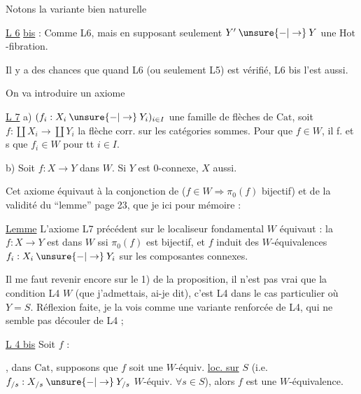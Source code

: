Notons la variante bien naturelle

\uline{L 6} \uline{bis} : Comme L6,  mais en supposant seulement $Y'\mathbin{\unsure{-|\to}}Y$ une $\mathrm{Hot}$-fibration.

Il y a des chances que  quand L6 (ou seulement L5) est vérifié, L6 bis l'est aussi.

On va introduire un axiome

\uline{L 7} a)  $(f_i:X_i\mathbin{\unsure{-|\to}}Y_i)_{i\in I}$ une famille de flèches de $\mathrm{Cat}$, soit $f:\coprod X_i\longrightarrow\coprod Y_i$ la flèche  corr. sur les catégories sommes. Pour que $f\in W$,  il f. et s que $f_i\in W$ pour tt $i\in I$.

b) Soit $f:X\longrightarrow Y$ dans $W$. Si $Y$ est $0$-connexe, $X$ aussi.

Cet axiome équivaut à la conjonction de  ($f\in W\Longrightarrow\pi_0(f)$ bijectif) et de la validité du ``lemme'' page 23, que je  ici pour mémoire :

\uline{Lemme} L'axiome L7 précédent sur le localiseur fondamental $W$ équivaut : la   $f:X\longrightarrow Y$  est dans $W$ ssi $\pi_0(f)$ est bijectif, et  $f$ induit des $W$-équivalences $f_i:X_i\mathbin{\unsure{-|\to}}Y_i$ sur les composantes connexes.

Il me faut revenir encore sur le 1) de la proposition, il n'est pas vrai que   la condition L4  $W$ (que j'admettais, ai-je dit), c'est L4 dans le cas particulier où $Y=S$. Réflexion faite, je la vois comme une variante renforcée de L4, qui ne semble pas  découler de L4 ; 

\uline{L 4 bis} Soit $f$ :


,  dans $\mathrm{Cat}$, supposons que  $f$ soit une $W$-équiv. \uline{loc. sur} $S$ (i.e. $f_{/s}:X_{/s}\mathbin{\unsure{-|\to}}Y_{/s}$  $W$-équiv. $\forall s\in S$), alors $f$ est une $W$-équivalence.


